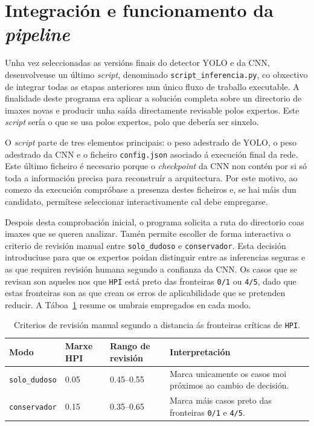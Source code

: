 \section{Integración e funcionamento da \textit{pipeline}}
Unha vez seleccionadas as versións finais do detector YOLO e da CNN, desenvolveuse un último
\textit{script}, denominado \texttt{script\_inferencia.py}, co obxectivo de integrar todas as
etapas anteriores nun único fluxo de traballo executable. A finalidade deste programa era
aplicar a solución completa sobre un directorio de imaxes novas e
producir unha saída directamente revisable polos expertos. Este \textit{script} sería o que se usa
polos expertos, polo que debería ser sinxelo.

O \textit{script} parte de tres elementos principais: o peso adestrado de YOLO, o peso adestrado da
CNN e o ficheiro \texttt{config.json} asociado á execución final da rede. Este último ficheiro é
necesario porque o \textit{checkpoint} da CNN non contén por si só toda a información precisa para
reconstruír a arquitectura. Por este motivo, ao comezo da execución compróbase a presenza destes ficheiros e, se hai
máis dun candidato, permítese seleccionar interactivamente cal debe empregarse.

Despois desta comprobación inicial, o programa solicita a ruta do directorio coas imaxes que se
queren analizar. Tamén permite escoller de forma interactiva o criterio de revisión manual entre
\texttt{solo\_dudoso} e \texttt{conservador}. Esta decisión introduciuse para que os expertos poidan distinguir entre as
inferencias seguras e as que requiren revisión humana segundo a confianza da CNN. Os casos que se
revisan son aqueles nos que \texttt{HPI} está preto das fronteiras \texttt{0/1} ou \texttt{4/5},
dado que estas fronteiras son as que crean os erros de aplicabilidade que se pretenden reducir. A
Táboa~\ref{tab:modos-revision-pipeline} resume os umbrais empregados en cada modo.

{
\begin{table}[htbp]
    \centering
    \footnotesize
    \setlength{\tabcolsep}{4pt}
    \begin{tabular}{p{}|p{}|p{}|p{}}
        \rowcolor{udcpink!25}
        \textbf{Modo} & \textbf{Marxe HPI} & \textbf{Rango de revisión} & \textbf{Interpretación} \\\hline
        \texttt{solo\_dudoso} & 0.05 & 0.45--0.55 & Marca unicamente os casos moi próximos ao cambio de decisión. \\
        \texttt{conservador} & 0.15 & 0.35--0.65 & Marca máis casos preto das fronteiras \texttt{0/1} e \texttt{4/5}. \\
    \end{tabular}
    \caption{Criterios de revisión manual segundo a distancia ás fronteiras críticas de \texttt{HPI}.}
    \label{tab:modos-revision-pipeline}
\end{table}
}

